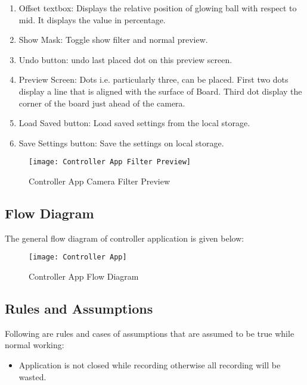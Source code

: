 \begin{enumerate}

\item Offset textbox: Displays the relative position of glowing ball with respect to mid. It displays the value in percentage.
\item Show Mask: Toggle show filter and normal preview.
\item Undo button: undo last placed dot on this preview screen.
\item Preview Screen: Dots i.e. particularly three, can be placed. First two dots display a line that is aligned with the surface of Board. Third dot display the corner of the board just ahead of the camera.
\item Load Saved button: Load saved settings from the local storage.
\item Save Settings button: Save the settings on local storage.

\end{enumerate}

\begin{figure}[h]
  \centering
  \texttt{[image: Controller App Filter Preview]}
  \caption{Controller App Camera Filter Preview}
\end{figure}

\subsection{Flow Diagram}
The general flow diagram of controller application is given below:

\begin{figure}[h]
  \centering
  \texttt{[image: Controller App]}
  \caption{Controller App Flow Diagram}
\end{figure}

\subsection{Rules and Assumptions}
Following are rules and cases of assumptions that are assumed to be true while normal working:

\begin{itemize}

\item Application is not closed while recording otherwise all recording will be wasted.

\end{itemize}


